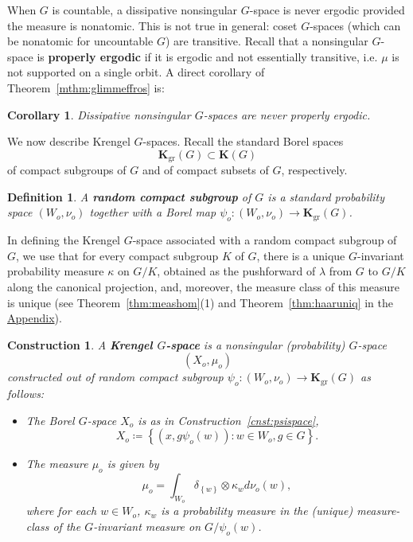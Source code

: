 \documentclass{amsart}
\numberwithin{equation}{subsection}
\newtheorem{cor}[thm]{Corollary}
\newtheorem{defn}[thm]{Definition}
\newtheorem{con}[thm]{Construction}
\begin{document}
When \(G\) is countable, a dissipative nonsingular \(G\)-space is never ergodic provided the measure is nonatomic. This is not true in general: coset \(G\)-spaces (which can be nonatomic for uncountable \(G\)) are transitive. Recall that a nonsingular \(G\)-space is {\bf properly ergodic} if it is ergodic and not essentially transitive, i.e. \(\mu\) is not supported on a single orbit. A direct corollary of Theorem~\ref{mthm:glimmeffros} is:

\begin{cor}
Dissipative nonsingular \(G\)-spaces are never properly ergodic.
\end{cor}

We now describe Krengel \(G\)-spaces. Recall the standard Borel spaces
\[\mathbf{K}_{\mathrm{gr}}\left(G\right)\subset\mathbf{K}\left(G\right)\]
of compact subgroups of \(G\) and of compact subsets of \(G\), respectively.

\begin{defn}
A {\bf random compact subgroup} of \(G\) is a standard probability space \(\left(W_{o},\nu_{o}\right)\) together with a Borel map \(\psi_{o}:\left(W_{o},\nu_{o}\right)\to\mathbf{K}_{\mathrm{gr}}\left(G\right)\).
\end{defn}

In defining the Krengel \(G\)-space associated with a random compact subgroup of \(G\), we use that for every compact subgroup \(K\) of \(G\), there is a unique \(G\)-invariant probability measure \(\kappa\) on \(G/K\), obtained as the pushforward of \(\lambda\) from \(G\) to \(G/K\) along the canonical projection, and, moreover, the measure class of this measure is unique (see Theorem~\ref{thm:meashom}(1) and Theorem~\ref{thm:haaruniq} in the \hyperref[Appendix: Measures on Homogeneous Spaces]{Appendix}).

\begin{con}
\label{cnst:krengel}
A {\bf Krengel \(G\)-space} is a nonsingular (probability) \(G\)-space
\[\left(X_{o},\mu_{o}\right)\]
constructed out of random compact subgroup \(\psi_{o}:\left(W_{o},\nu_{o}\right)\to\mathbf{K}_{\mathrm{gr}}\left(G\right)\) as follows:
\begin{itemize}
    \item The Borel \(G\)-space \(X_{o}\) is as in Construction~\ref{cnst:psispace},
    \[X_{o}\coloneqq \left\{\left(x,g\psi_{o}\left(w\right)\right):w\in W_{o},g\in G\right\}.\]
    \item The measure \(\mu_{o}\) is given by
    \[\mu_{o}=\int_{W_{o}}\delta_{\left\{ w\right\} }\otimes\kappa_{w}d\nu_{o}\left(w\right),\]
    where for each \(w\in W_{o}\), \(\kappa_{w}\) is a probability measure in the (unique) measure-class of the \(G\)-invariant measure on \(G/\psi_{o}\left(w\right)\).
\end{itemize}
\end{con}
\end{document}
